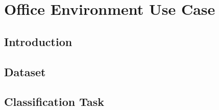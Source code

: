 \chapter{Office Environment Use Case}

\section{Introduction}

\section{Dataset}

\section{Classification Task}
